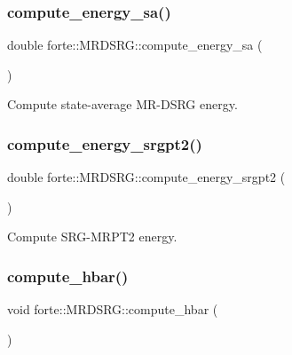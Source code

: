 \subsubsection{\texorpdfstring{compute\+\_\+energy\+\_\+sa()}{compute\_energy\_sa()}}
{\footnotesize\ttfamily double forte\+::\+M\+R\+D\+S\+R\+G\+::compute\+\_\+energy\+\_\+sa (\begin{DoxyParamCaption}{ }\end{DoxyParamCaption})}



Compute state-\/average M\+R-\/\+D\+S\+RG energy. 

\mbox{\label{classforte_1_1_m_r_d_s_r_g_a5f6e9cf959073b59cfe3d4a54df2cbfc}} 
\subsubsection{\texorpdfstring{compute\+\_\+energy\+\_\+srgpt2()}{compute\_energy\_srgpt2()}}
{\footnotesize\ttfamily double forte\+::\+M\+R\+D\+S\+R\+G\+::compute\+\_\+energy\+\_\+srgpt2 (\begin{DoxyParamCaption}{ }\end{DoxyParamCaption})\hspace{0.3cm}{\ttfamily [protected]}}



Compute S\+R\+G-\/\+M\+R\+P\+T2 energy. 

\mbox{\label{classforte_1_1_m_r_d_s_r_g_aab4300bf4f2a6aa6f3c7c1c56687f3dc}} 
\subsubsection{\texorpdfstring{compute\+\_\+hbar()}{compute\_hbar()}}
{\footnotesize\ttfamily void forte\+::\+M\+R\+D\+S\+R\+G\+::compute\+\_\+hbar (\begin{DoxyParamCaption}{ }\end{DoxyParamCaption})\hspace{0.3cm}{\ttfamily [protected]}}



